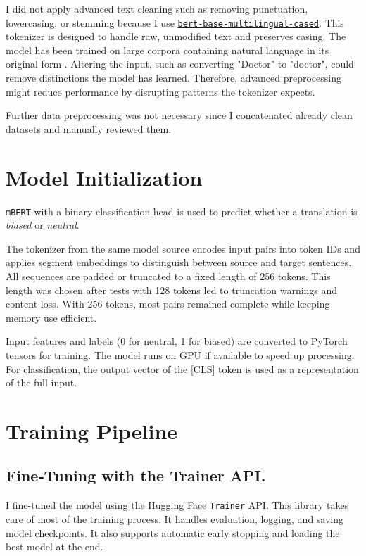     I did not apply advanced text cleaning such as removing punctuation, lowercasing, or stemming because I use \href{https://huggingface.co/google-bert/bert-base-multilingual-cased}{\texttt{bert-base-multilingual-cased}}. This tokenizer is designed to handle raw, unmodified text and preserves casing. The model has been trained on large corpora containing natural language in its original form \parencite{devlinBERTPretrainingDeep2019}. Altering the input, such as converting "Doctor" to "doctor", could remove distinctions the model has learned. Therefore, advanced preprocessing might reduce performance by disrupting patterns the tokenizer expects.

Further data preprocessing was not necessary since I concatenated already clean datasets and manually reviewed them.

\section{Model Initialization}
    \texttt{mBERT} with a binary classification head is used to predict whether a translation is \textit{biased} or \textit{neutral}.

    The tokenizer from the same model source encodes input pairs into token IDs and applies segment embeddings to distinguish between source and target sentences. All sequences are padded or truncated to a fixed length of 256 tokens. This length was chosen after tests with 128 tokens led to truncation warnings and content loss. With 256 tokens, most pairs remained complete while keeping memory use efficient.

    Input features and labels (0 for neutral, 1 for biased) are converted to PyTorch tensors for training. The model runs on GPU if available to speed up processing. For classification, the output vector of the [CLS] token is used as a representation of the full input.

\section{Training Pipeline}
\subsection{{Fine‑Tuning with the Trainer API.}}
    I fine-tuned the model using the Hugging Face \href{https://huggingface.co/docs/transformers/en/main_classes/trainer}{\texttt{Trainer} API}. This library takes care of most of the training process. It handles evaluation, logging, and saving model checkpoints. It also supports automatic early stopping and loading the best model at the end.

